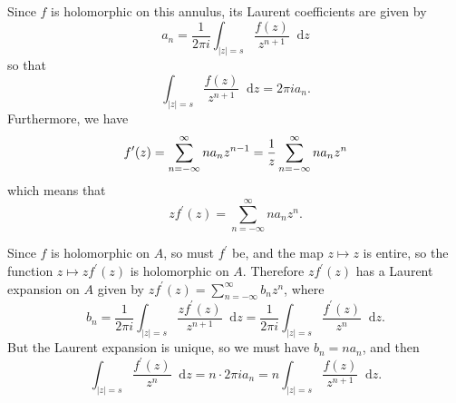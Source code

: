 \documentclass{article}
\newcommand\dif{\mathop{}\!\mathrm{d}}
\newcounter{Problem}
\newenvironment{Problem}{\begin{Exercise}[name={Problem},
                                          counter={Problem}]}
                        {\end{Exercise}}
\begin{document}

\begin{Answer}
Since $f$ is holomorphic on this annulus, its Laurent
coefficients are given by
$$
  a_n
= \frac{1}{2 \pi i}
  \int_{|z| = s}
    \frac{f(z)}{z^{n+1}}
    \dif z
$$
so that
$$
\int_{|z| = s}
    \frac{f(z)}{z^{n+1}}
    \dif z
= 2 \pi i a_n.
$$
Furthermore, we have
$$
   f^\prime(z)
= \sum_{n=-\infty}^\infty n a_n z^{n-1} \\
= \frac{1}{z} \sum_{n=-\infty}^{\infty} n a_n z^n
$$
which means that
$$
z f^\prime(z) = \sum_{n=-\infty}^\infty n a_n z^n.
$$

Since $f$ is holomorphic on $A$, so must $f^\prime$ be, and the
map $z \mapsto z$ is entire, so the function $z \mapsto z f^\prime(z)$
is holomorphic on $A$. Therefore $z f^\prime(z)$ has a Laurent expansion on $A$
given by
$z f^\prime(z) = \sum_{n=-\infty}^\infty b_n z^n$, where
$$
  b_n
= \frac{1}{2 \pi i}
  \int_{|z| = s}
    \frac{z f^\prime(z)}{z^{n+1}}
    \dif z
= \frac{1}{2 \pi i}
  \int_{|z| = s}
    \frac{f^\prime(z)}{z^n}
    \dif z.
$$
But the Laurent expansion is unique, so we must have $b_n = n a_n$, and then
$$
  \int_{|z| = s}
    \frac{f^\prime(z)}{z^n}
    \dif z
= n \cdot 2 \pi i a_n
= n \int_{|z| = s}
      \frac{f(z)}{z^{n+1}}
      \dif z.
$$

\end{Answer}
\end{document}

